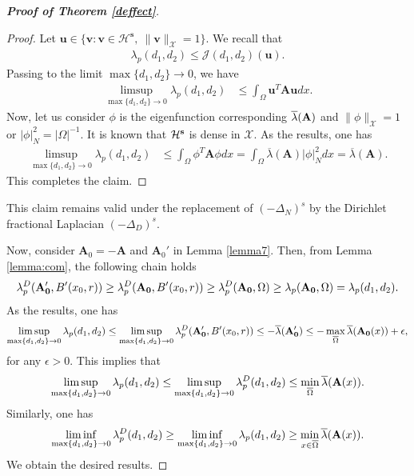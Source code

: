 \documentclass[a4paper,11pt]{amsart}
\theoremstyle{definition}
\def\O{\Omega}
\numberwithin{equation}{section}
\theoremstyle{definition}
\def\O{\Omega}
\begin{document}
\begin{proof} [\bf Proof of Theorem \ref{deffect}]
\begin{proof}
Let $\textbf{u}\in \{\textbf{v}:\textbf{v}\in \mathcal{H}^{\textbf{s}},~\|\textbf{v}\|_{\mathcal{X}}=1\}$. We recall that
\begin{align*}
\lambda_p(d_1,d_2)\leq \mathcal{J}({ d_1,d_2})(\textbf{u}).
\end{align*}
 Passing to the limit $\max\{d_1,d_2\}\rightarrow 0$, we have
\begin{align*}
\limsup_{\max\{d_1,d_2\}\rightarrow 0} \lambda_p(d_1,d_2)&\leq \int_{\O}\textbf{u}^T\textbf{A}\textbf{u}dx.
\end{align*}
Now, let us consider $\phi$ is the eigenfunction corresponding $\overline{\lambda}({\bf A})$ and $\|\phi\|_\mathcal{X}=1$ or $|\phi|_N^2 =|\O|^{-1}$. It is known that $\mathcal{H}^{\bf s}$ is dense in $\mathcal{X}$. As the results, one has
\begin{align*}
\limsup_{\max\{d_1,d_2\}\rightarrow 0} \lambda_p(d_1,d_2)&\leq \int_{\O}\phi^T\textbf{A}\phi dx=\int_{\O}\overline{\lambda}(\textbf{A})|\phi|^2_N dx= \overline{\lambda}(\textbf{A}).
\end{align*}
This completes the claim.
\end{proof}
This claim remains valid under the replacement of $(-\Delta_N)^s$ by the Dirichlet fractional Laplacian $(-\Delta_D)^s$.

\phantom{1}

Now, consider $\textbf{A}_0=-\textbf{A}$ and $\textbf{A}_0'$ in Lemma \ref{lemma7}. Then, from Lemma \ref{lemma:com}, the following chain holds
\begin{align*}
\lambda^D_p({\bf A'_0},B'(x_0,r))\geq \lambda^D_p({\bf A_0},B'(x_0,r))\geq \lambda_p^D({\bf A_0},\O)\geq \lambda_p({\bf A_0},\O)=\lambda_p(d_1,d_2).
\end{align*}
As the results, one has
\begin{align*}
\limsup_{\max\{d_1,d_2\}\rightarrow 0} \lambda_p(d_1,d_2)\leq \limsup_{\max\{d_1,d_2\}\rightarrow 0} \lambda^D_p({\bf A'_0},B'(x_0,r))\leq -\overline{\lambda}({\bf A_0'})\leq -\max_{\overline{\O}}\overline{\lambda}({\bf A_0}(x))+\epsilon,
\end{align*}
for any $\epsilon >0$. This implies that
\begin{align*}
\limsup_{\max\{d_1,d_2\}\rightarrow 0} \lambda_p(d_1,d_2)\leq \limsup_{\max\{d_1,d_2\}\rightarrow 0} \lambda^D_p(d_1,d_2)\leq \min_{\overline{\O}}\overline{\lambda}({\bf A}(x)).
\end{align*}
Similarly, one has
\begin{align*}
\liminf_{\max\{d_1,d_2\}\rightarrow 0}\lambda_p^D(d_1,d_2)\geq \liminf_{\max\{d_1,d_2\}\rightarrow 0}\lambda_p(d_1,d_2)\geq \min\limits_{x\in\overline{\O}}\overline{\lambda}({{\bf A}}(x)).
\end{align*}
We obtain the desired results.



\end{proof}
\end{document}
